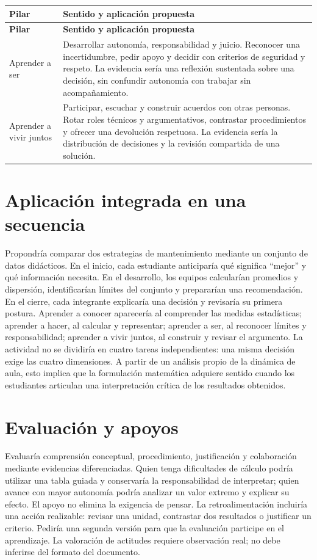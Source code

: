 \documentclass[spanish,letterpaper,oneside]{article}
\begin{document}
{\small{}\renewcommand{\arraystretch}{1.25}
\begin{longtable}{|>{\raggedright\arraybackslash}p{}|>{\raggedright\arraybackslash}p{}|}\hline
\rowcolor{iiiepePale} \textbf{Pilar} & \textbf{Sentido y aplicación propuesta} \\\hline
\endfirsthead
\hline
\rowcolor{iiiepePale} \textbf{Pilar} & \textbf{Sentido y aplicación propuesta} \\\hline
\endhead
Aprender a ser & Desarrollar autonomía, responsabilidad y juicio. Reconocer una incertidumbre, pedir apoyo y decidir con criterios de seguridad y respeto. La evidencia sería una reflexión sustentada sobre una decisión, sin confundir autonomía con trabajar sin acompañamiento. \\\hline
Aprender a vivir juntos & Participar, escuchar y construir acuerdos con otras personas. Rotar roles técnicos y argumentativos, contrastar procedimientos y ofrecer una devolución respetuosa. La evidencia sería la distribución de decisiones y la revisión compartida de una solución. \\\hline
\end{longtable}}


\section{Aplicación integrada en una secuencia}
Propondría comparar dos estrategias de mantenimiento mediante un conjunto de datos didácticos. En el inicio, cada estudiante anticiparía qué significa ``mejor'' y qué información necesita. En el desarrollo, los equipos calcularían promedios y dispersión, identificarían límites del conjunto y prepararían una recomendación. En el cierre, cada integrante explicaría una decisión y revisaría su primera postura.
Aprender a conocer aparecería al comprender las medidas estadísticas; aprender a hacer, al calcular y representar; aprender a ser, al reconocer límites y responsabilidad; aprender a vivir juntos, al construir y revisar el argumento. La actividad no se dividiría en cuatro tareas independientes: una misma decisión exige las cuatro dimensiones. A partir de un análisis propio de la dinámica de aula, esto implica que la formulación matemática adquiere sentido cuando los estudiantes articulan una interpretación crítica de los resultados obtenidos.
\section{Evaluación y apoyos}
Evaluaría comprensión conceptual, procedimiento, justificación y colaboración mediante evidencias diferenciadas. Quien tenga dificultades de cálculo podría utilizar una tabla guiada y conservaría la responsabilidad de interpretar; quien avance con mayor autonomía podría analizar un valor extremo y explicar su efecto. El apoyo no elimina la exigencia de pensar.
La retroalimentación incluiría una acción realizable: revisar una unidad, contrastar dos resultados o justificar un criterio. Pediría una segunda versión para que la evaluación participe en el aprendizaje. La valoración de actitudes requiere observación real; no debe inferirse del formato del documento.
\end{document}
